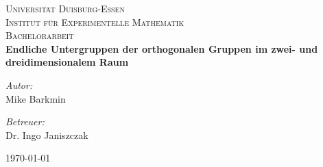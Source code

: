 
\begin{titlepage}
\begin{center}


\textsc{\LARGE Universität Duisburg-Essen}\\
\textsc{Institut für Experimentelle Mathematik}\\[1.5cm]

\textsc{\Large Bachelorarbeit}\\[0.5cm]

{ \huge \bfseries Endliche Untergruppen der orthogonalen Gruppen im zwei- und dreidimensionalem Raum \\[0.8cm] }

\begin{minipage}{0.4\textwidth}
\begin{flushleft} \large
\emph{Autor:}\\
Mike Barkmin
\end{flushleft}
\end{minipage}
\begin{minipage}{0.4\textwidth}
\begin{flushright} \large
\emph{Betreuer:} \\
Dr. Ingo Janiszczak
\end{flushright}
\end{minipage}

\vfill

{\large \today}
\end{center}
\end{titlepage}
